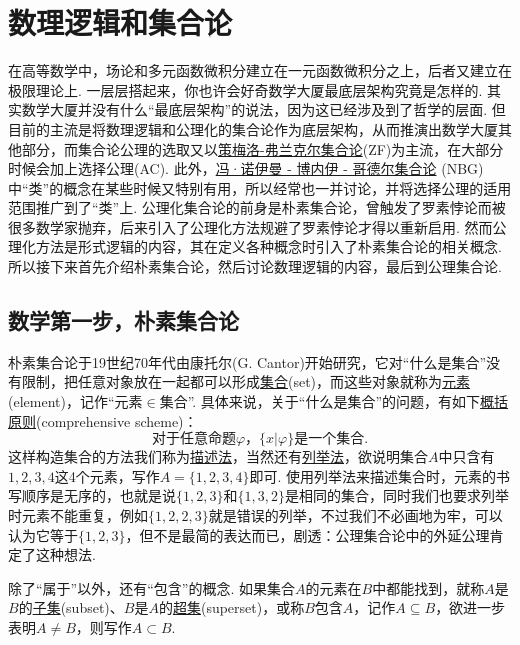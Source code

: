 
{\let\newpage\relax \part{数理逻辑和集合论}}

在高等数学中，场论和多元函数微积分建立在一元函数微积分之上，后者又建立在极限理论上. 一层层搭起来，你也许会好奇数学大厦最底层架构究竟是怎样的. 其实数学大厦并没有什么“最底层架构”的说法，因为这已经涉及到了哲学的层面. 但目前的主流是将数理逻辑和公理化的集合论作为底层架构，从而推演出数学大厦其他部分，而集合论公理的选取又以\underline{策梅洛-弗兰克尔集合论}(\textsf{ZF})为主流，在大部分时候会加上选择公理(AC). 此外，\underline{冯·诺伊曼 - 博内伊 - 哥德尔集合论} (\textsf{NBG})中“类”的概念在某些时候又特别有用，所以经常也一并讨论，并将选择公理的适用范围推广到了“类”上. 公理化集合论的前身是朴素集合论，曾触发了罗素悖论而被很多数学家抛弃，后来引入了公理化方法规避了罗素悖论才得以重新启用. 然而公理化方法是形式逻辑的内容，其在定义各种概念时引入了朴素集合论的相关概念. 所以接下来首先介绍朴素集合论，然后讨论数理逻辑的内容，最后到公理集合论.

\chapter{数学第一步，朴素集合论}

朴素集合论于19世纪70年代由康托尔(G. Cantor)开始研究，它对“什么是集合”没有限制，把任意对象放在一起都可以形成\underline{集合}(set)，而这些对象就称为\underline{元素}(element)，记作“元素\(\in\)集合”. 具体来说，关于“什么是集合”的问题，有如下\underline{概括原则}(comprehensive scheme)：
\[\mbox{对于任意命题}\varphi\mbox{，}\{x|\varphi\}\mbox{是一个集合.}\]
这样构造集合的方法我们称为\underline{描述法}，当然还有\underline{列举法}，欲说明集合\(A\)中只含有\(1,2,3,4\)这4个元素，写作\(A=\{1,2,3,4\}\)即可. 使用列举法来描述集合时，元素的书写顺序是无序的，也就是说\(\{1,2,3\}\)和\(\{1,3,2\}\)是相同的集合，同时我们也要求列举时元素不能重复，例如\(\{1,2,2,3\}\)就是错误的列举，不过我们不必画地为牢，可以认为它等于\(\{1,2,3\}\)，但不是最简的表达而已，剧透：公理集合论中的外延公理肯定了这种想法.

除了“属于”以外，还有“包含”的概念. 如果集合\(A\)的元素在\(B\)中都能找到，就称\(A\)是\(B\)的\underline{子集}(subset)、\(B\)是\(A\)的\underline{超集}(superset)，或称\(B\)包含\(A\)，记作\(A \subseteq B\)，欲进一步表明\(A \neq B\)，则写作\(A \subset B\).

